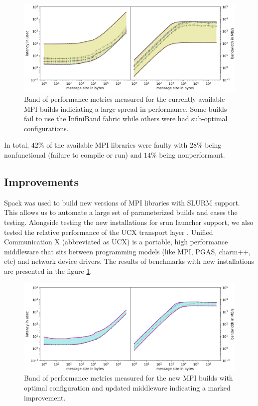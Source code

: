\documentclass[sigconf,authordraft]{acmart}
\begin{document}
\begin{figure}[h]
	\centering
	\includegraphics[width=1.05\linewidth]{curr_pearc}
	\caption{Band of performance metrics measured for the currently
			 available MPI builds indiciating a large spread in 
			 performance. Some builds fail to use the InfiniBand fabric while others were had sub-optimal configurations.}
	\label{fig:currmpi}
\end{figure}

In total, $42\%$ of the available MPI libraries were faulty with $28\%$ being nonfunctional (failure to compile or run) and $14\%$ being nonperformant.

\subsection{Improvements}
 
Spack\cite{spack} was used to build new versions of MPI libraries with SLURM support. This allows us to automate a large set of parameterized builds and eases the testing. Alongside testing the new installations for srun launcher support, we also tested the relative performance of the UCX transport layer \cite{shamis2015ucx,openucx-website}. Unified Communication X (abbreviated as UCX) is a portable, high performance middleware that sits between programming models (like MPI, PGAS, charm++, etc) and network device drivers. The results of benchmarks with new installations are presented in the figure \ref{fig:currmpi}. 

\begin{figure}[h]
	\centering
	\includegraphics[width=1.05\linewidth]{new_pearc}
	\caption{Band of performance metrics measured for the new MPI builds
			with optimal configuration and updated middleware indicating
			a marked improvement.}
	\label{fig:newmpi}
\end{figure}
\end{document}
